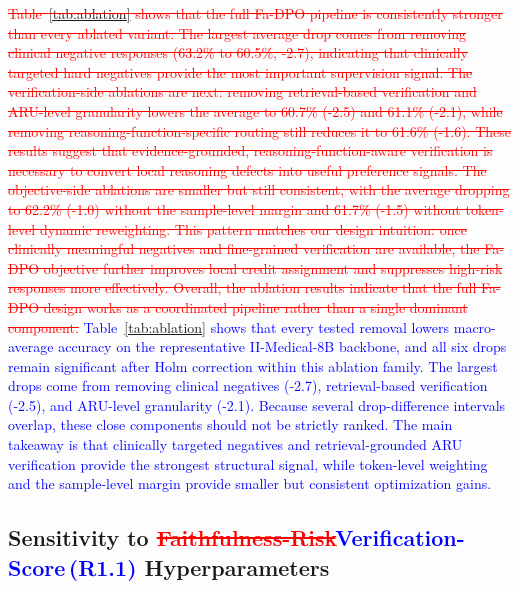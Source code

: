 \documentclass[a4paper,fleqn,doubleblind]{cas-sc}
\DeclareRobustCommand{\deleted}[1]{\textcolor{red}{\sout{#1}}}
\DeclareRobustCommand{\added}[1]{\textcolor{blue}{#1}}
\DeclareRobustCommand{\revtag}[1]{\textcolor{blue}{\scriptsize\,(\textbf{#1})}}
\begin{document}
\deleted{Table~\ref{tab:ablation} shows that the full Fa-DPO pipeline is consistently stronger than every ablated variant. The largest average drop comes from removing clinical negative responses (63.2\% to 60.5\%, -2.7), indicating that clinically targeted hard negatives provide the most important supervision signal. The verification-side ablations are next: removing retrieval-based verification and ARU-level granularity lowers the average to 60.7\% (-2.5) and 61.1\% (-2.1), while removing reasoning-function-specific routing still reduces it to 61.6\% (-1.6). These results suggest that evidence-grounded, reasoning-function-aware verification is necessary to convert local reasoning defects into useful preference signals. The objective-side ablations are smaller but still consistent, with the average dropping to 62.2\% (-1.0) without the sample-level margin and 61.7\% (-1.5) without token-level dynamic reweighting. This pattern matches our design intuition: once clinically meaningful negatives and fine-grained verification are available, the Fa-DPO objective further improves local credit assignment and suppresses high-risk responses more effectively. Overall, the ablation results indicate that the full Fa-DPO design works as a coordinated pipeline rather than a single dominant component.}
\added{Table~\ref{tab:ablation} shows that every tested removal lowers macro-average accuracy on the representative II-Medical-8B backbone, and all six drops remain significant after Holm correction within this ablation family. The largest drops come from removing clinical negatives (-2.7), retrieval-based verification (-2.5), and ARU-level granularity (-2.1). Because several drop-difference intervals overlap, these close components should not be strictly ranked. The main takeaway is that clinically targeted negatives and retrieval-grounded ARU verification provide the strongest structural signal, while token-level weighting and the sample-level margin provide smaller but consistent optimization gains.}

\subsection{Sensitivity to \deleted{Faithfulness-Risk}\added{Verification-Score}\revtag{R1.1} Hyperparameters}
\label{subsec:sensitivity}
\end{document}
